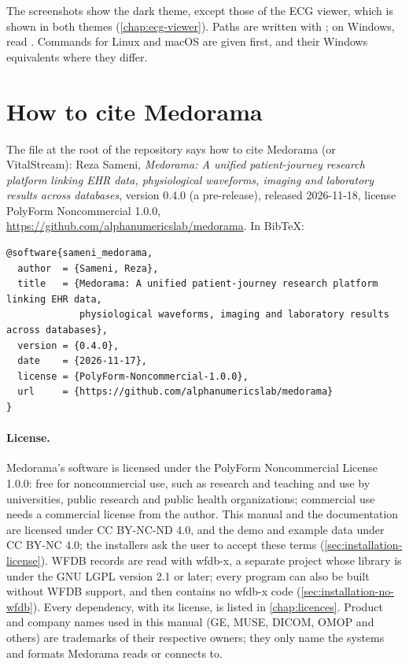 The screenshots show the dark theme, except those of the ECG viewer, which is shown in both
themes (\cref{chap:ecg-viewer}). Paths are written with \code{/}; on Windows, read \code{\textbackslash}.
Commands for Linux and macOS are given first, and their Windows equivalents where they differ.

\section{How to cite Medorama}
\label{sec:introduction-cite}

The file  at the root of the repository says how to cite Medorama (or
VitalStream): Reza Sameni, \emph{Medorama: A unified patient-journey research platform
linking EHR data, physiological waveforms, imaging and laboratory results across databases},
version 0.4.0 (a pre-release), released 2026-11-18, license PolyForm Noncommercial 1.0.0,
\url{https://github.com/alphanumericslab/medorama}. In BibTeX:
\begin{lstlisting}[style=text]
@software{sameni_medorama,
  author  = {Sameni, Reza},
  title   = {Medorama: A unified patient-journey research platform linking EHR data,
             physiological waveforms, imaging and laboratory results across databases},
  version = {0.4.0},
  date    = {2026-11-17},
  license = {PolyForm-Noncommercial-1.0.0},
  url     = {https://github.com/alphanumericslab/medorama}
}
\end{lstlisting}

\paragraph{License.} Medorama's software is licensed under the PolyForm Noncommercial License
1.0.0: free for noncommercial use, such as research and teaching and use by universities, public
research and public health organizations; commercial use needs a commercial license from the
author. This manual and the documentation are licensed under CC BY-NC-ND 4.0, and the demo and
example data under CC BY-NC 4.0; the installers ask the user to accept these terms
(\cref{sec:installation-license}). WFDB
records are read with wfdb-x, a separate project whose library is under the GNU LGPL version 2.1
or later; every
program can also be built without WFDB support, and then contains no wfdb-x code
(\cref{sec:installation-no-wfdb}). Every dependency, with its license, is listed in
\cref{chap:licences}. Product and company names used in this
manual (GE, MUSE, DICOM, OMOP and others) are trademarks of their respective owners; they only
name the systems and formats Medorama reads or connects to.
